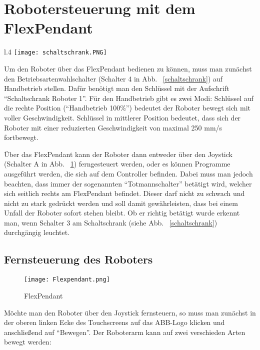 \section{Robotersteuerung mit dem FlexPendant}
\label{flexsection}
\begin{wrapfigure}{l}{.4\textwidth}
\centering
\texttt{[image: schaltschrank.PNG]}
\vspace{-15pt}
\caption{Schaltschrank} 
\label{schaltschrank}
\end{wrapfigure}

Um den Roboter über das FlexPendant bedienen zu können, muss man zunächst den Betriebsartenwahlschalter (Schalter 4 in Abb. ~\ref{schaltschrank}) auf Handbetrieb stellen. Dafür benötigt man den Schlüssel mit der Aufschrift \enquote{Schaltschrank Roboter 1}. Für den Handbetrieb gibt es zwei Modi: Schlüssel auf die rechte Position (\enquote{Handbetrieb 100\%}) bedeutet der Roboter bewegt sich mit voller Geschwindigkeit. Schlüssel in mittlerer Position bedeutet, dass sich der Roboter mit einer reduzierten Geschwindigkeit von maximal 250 mm/s fortbewegt.

Über das FlexPendant kann der Roboter dann entweder über den Joystick (Schalter A in Abb. ~\ref{flexpendant}) ferngesteuert werden, oder es können Programme ausgeführt werden, die sich auf dem Controller befinden. Dabei muss man jedoch beachten, dass immer der sogenannten \enquote{Totmannschalter} betätigt wird, welcher sich seitlich rechts am FlexPendant befindet. Dieser darf nicht zu schwach und nicht zu stark gedrückt werden und soll damit gewährleisten, dass bei einem Unfall der Roboter sofort stehen bleibt. Ob er richtig betätigt wurde erkennt man, wenn Schalter 3 am Schaltschrank (siehe Abb. ~\ref{schaltschrank}) durchgängig leuchtet. 

\subsection{Fernsteuerung des Roboters}

\begin{figure}[htbp]
\centering
\texttt{[image: Flexpendant.png]}
\caption{FlexPendant} 
\label{flexpendant}
\end{figure}

Möchte man den Roboter über den Joystick fernsteuern, so muss man zunächst in der oberen linken Ecke des Touchscreens auf das ABB-Logo klicken und anschließend auf \enquote{Bewegen}. Der Roboterarm kann auf zwei verschieden Arten bewegt werden:

